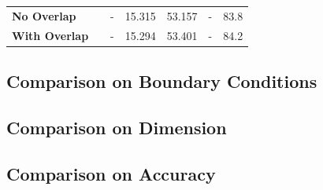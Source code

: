 \begin{table}
\begin{minipage}{\columnwidth}
\begin{center}
\begin{tabular}{>{\bfseries}p{3cm} p{1.5cm} p{1.5cm} p{1.5cm} p{1.5cm} p{1.5cm} p{1cm}}
        No Overlap    &                               &   -    & 15.315  & 53.157   &   -                                        & 83.8 \\
        With Overlap  &                               &   -    & 15.294  & 53.401   &   -                                        & 84.2 \\
        \bottomrule
      \end{tabular}
    \end{center}
  \end{minipage}
\end{table}


\subsection{Comparison on Boundary Conditions}


\subsection{Comparison on Dimension}


\subsection{Comparison on Accuracy}







